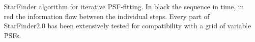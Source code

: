 StarFinder algorithm for iterative PSF-fitting. In black the sequence in time, in red the information flow between the individual steps. Every part of StarFinder2.0 has been extensively tested for compatibility with a grid of variable PSFs.
  
  